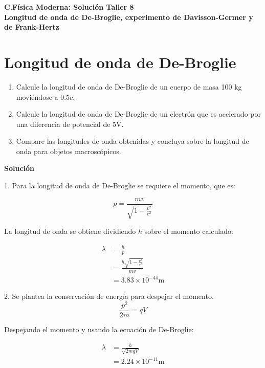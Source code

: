 \documentclass[12pt]{article}
\begin{document}
 
\begin{center}
\Large \textbf{C.Física Moderna: Solución Taller 8}\\
\normalsize \textbf{Longitud de onda de De-Broglie, experimento de Davisson-Germer y de Frank-Hertz}
\end{center}
 
  

\section{Longitud de onda de De-Broglie }



\begin{enumerate}
	\item Calcule la longitud de onda de De-Broglie de un cuerpo de masa 100 kg moviéndose a $0.5c$.
	\item Calcule la longitud de onda de De-Broglie de un electrón que es acelerado por una diferencia de potencial de 5V.
	\item Compare las longitudes de onda obtenidas y concluya sobre la longitud de onda para objetos macroscópicos.
\end{enumerate}


\begin{center}
	\textbf{Solución}
\end{center}

1. Para la longitud de onda de De-Broglie se requiere el momento, que es:

\begin{equation*}
p = \frac{m v}{\sqrt{1-\frac{v^2}{c^2}}}
\end{equation*} 

La longitud de onda se obtiene dividiendo $h$ sobre el momento calculado:

\begin{align*}
\lambda &= \frac{h}{p} \\
&= \frac{h\sqrt{1-\frac{v^2}{c^2}}}{m v}\\
& = 3.83 \times 10^{-44} \text{m}
\end{align*}

2. Se plantea la conservación de energía para despejar el momento.
\begin{equation*}
\frac{p^2}{2m} = q V
\end{equation*}

Despejando el momento y usando la ecuación de De-Broglie:

\begin{align*}
\lambda &= \frac{h}{\sqrt{2 m q V}}\\
 &= 2.24 \times 10^{-11} \text{m}
\end{align*}
\end{document}
